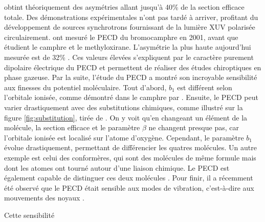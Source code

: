  obtint théoriquement des asymétries allant jusqu'à 40\% de la section efficace totale. Des démonstrations expérimentales n'ont pas tardé à arriver, profitant du développement de sources synchrotrons fournissant de la lumière XUV polarisée circulairement.  ont mesuré le PECD du bromocamphre en 2001, avant que  étudient le camphre et  le methyloxirane. L'asymétrie la plus haute aujourd'hui mesurée est de 32\% . Ces valeurs élevées s'expliquent par le caractère purement dipolaire électrique du PECD et permettent de réaliser des études chiroptiques en phase gazeuse.
Par la suite, l'étude du PECD a montré son incroyable sensibilité aux finesses du potentiel moléculaire. Tout d'abord, $b_1$ est différent selon l'orbitale ionisée, comme démontré dans le camphre par . Ensuite, le PECD peut varier drastiquement avec des substitutions chimiques, comme illustré sur la figure \ref{fig:substitution}, tirée de . On y voit qu'en changeant un élément de la molécule, la section efficace et le paramètre $\beta$ ne changent presque pas, car l'orbitale ionisée est localisé sur l'atome d'oxygène. Cependant, le paramètre $b_1$ évolue drastiquement, permettant de différencier les quatres molécules. Un autre exemple est celui des conformères, qui sont des molécules de même formule mais dont les atomes ont tourné autour d'une liaison chimique. Le PECD est également capable de distinguer ces deux molécules . Pour finir, il a récemment été observé que le PECD était sensible aux modes de vibration, c'est-à-dire aux mouvements des noyaux .

Cette sensibilité  
%
%
